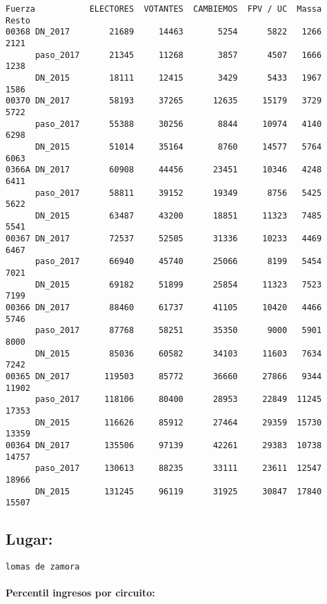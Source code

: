 \documentclass[11pt]{article}
\begin{document}
    \begin{verbatim}
Fuerza           ELECTORES  VOTANTES  CAMBIEMOS  FPV / UC  Massa  Resto
00368 DN_2017        21689     14463       5254      5822   1266   2121
      paso_2017      21345     11268       3857      4507   1666   1238
      DN_2015        18111     12415       3429      5433   1967   1586
00370 DN_2017        58193     37265      12635     15179   3729   5722
      paso_2017      55388     30256       8844     10974   4140   6298
      DN_2015        51014     35164       8760     14577   5764   6063
0366A DN_2017        60908     44456      23451     10346   4248   6411
      paso_2017      58811     39152      19349      8756   5425   5622
      DN_2015        63487     43200      18851     11323   7485   5541
00367 DN_2017        72537     52505      31336     10233   4469   6467
      paso_2017      66940     45740      25066      8199   5454   7021
      DN_2015        69182     51899      25854     11323   7523   7199
00366 DN_2017        88460     61737      41105     10420   4466   5746
      paso_2017      87768     58251      35350      9000   5901   8000
      DN_2015        85036     60582      34103     11603   7634   7242
00365 DN_2017       119503     85772      36660     27866   9344  11902
      paso_2017     118106     80400      28953     22849  11245  17353
      DN_2015       116626     85912      27464     29359  15730  13359
00364 DN_2017       135506     97139      42261     29383  10738  14757
      paso_2017     130613     88235      33111     23611  12547  18966
      DN_2015       131245     96119      31925     30847  17840  15507
    \end{verbatim}

    
    \hypertarget{lugar}{%
\subsection{Lugar:}\label{lugar}}

    
    \begin{Verbatim}[commandchars=\\\{\}]
lomas de zamora

    \end{Verbatim}

    \hypertarget{percentil-ingresos-por-circuito}{%
\paragraph{Percentil ingresos por
circuito:}\label{percentil-ingresos-por-circuito}}
\end{document}
